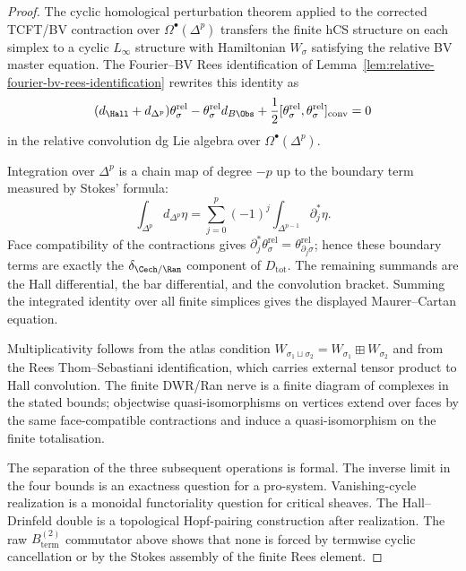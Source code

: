 \begin{proof}
The cyclic homological perturbation theorem applied to the corrected
TCFT/BV contraction over $\Omega^\bullet(\Delta^p)$ transfers the
finite hCS structure on each simplex to a cyclic $L_\infty$ structure
with Hamiltonian
$W_\sigma$ satisfying the relative BV master equation. The
Fourier--BV Rees identification of
Lemma~\ref{lem:relative-fourier-bv-rees-identification} rewrites this
identity as
\[
 (d_{\Hall}+d_{\Delta^p})\theta_\sigma^{\mathrm{rel}}
 -\theta_\sigma^{\mathrm{rel}}d_{B\Obs}
 +\frac{1}{2}
 [\theta_\sigma^{\mathrm{rel}},\theta_\sigma^{\mathrm{rel}}]_{\mathrm{conv}}
 =0
\]
in the relative convolution dg Lie algebra over
$\Omega^\bullet(\Delta^p)$.

Integration over $\Delta^p$ is a chain map of degree $-p$ up to the
boundary term measured by Stokes' formula:
\[
 \int_{\Delta^p} d_{\Delta^p}\eta
 =
 \sum_{j=0}^{p}(-1)^j
 \int_{\Delta^{p-1}}\partial_j^*\eta .
\]
Face compatibility of the contractions gives
$\partial_j^*\theta_\sigma^{\mathrm{rel}}
=\theta_{\partial_j\sigma}^{\mathrm{rel}}$; hence these boundary
terms are exactly the $\delta_{\Cech/\Ran}$ component of
$D_{\mathrm{tot}}$. The remaining summands are the Hall differential,
the bar differential, and the convolution bracket. Summing the
integrated identity over all finite simplices gives the displayed
Maurer--Cartan equation.

Multiplicativity follows from the atlas condition
$W_{\sigma_1\sqcup\sigma_2}=W_{\sigma_1}\boxplus W_{\sigma_2}$ and
from the Rees Thom--Sebastiani identification, which carries external
tensor product to Hall convolution. The finite DWR/Ran nerve is a
finite diagram of complexes in the stated bounds; objectwise
quasi-isomorphisms on vertices extend over faces by the same
face-compatible contractions and induce a quasi-isomorphism on the
finite totalisation.

The separation of the three subsequent operations is formal. The
inverse limit in the four bounds is an exactness question for a
pro-system. Vanishing-cycle realization is a monoidal functoriality
question for critical sheaves. The Hall--Drinfeld double is a
topological Hopf-pairing construction after realization. The raw
$B_{\mathrm{term}}^{(2)}$ commutator above shows that none is forced by
termwise cyclic cancellation or by the Stokes assembly of the finite
Rees element.
\end{proof}

